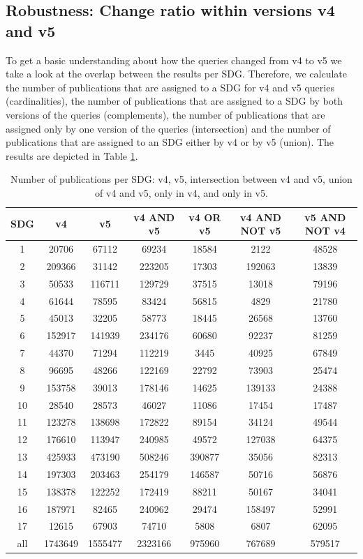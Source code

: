 \documentclass{article}
\begin{document}
\subsection{Robustness: Change ratio within versions v4 and v5}
\label{sec:robustness}
To get a basic understanding about how the queries changed from v4 to v5 we take a look at the overlap between the results per SDG. Therefore, we calculate the number of publications that are assigned to a SDG for v4 and v5 queries (cardinalities), the number of publications that are assigned to a SDG by both versions of the queries (complements), the number of publications that are assigned only by one version of the queries (intersection) and the number of publications that are assigned to an SDG either by v4 or by v5 (union). The results are depicted in Table \ref{venndataofpublications}.
\begin{table}[H]
\centering 
 \begin{tabular}{ccccccc}
 \toprule
  SDG & v4 & v5 & v4 AND v5 & v4 OR v5 & v4 AND NOT v5 & v5 AND NOT v4 \\
  \hline
 1 & 20706 & 67112 & 69234 & 18584 & 2122 & 48528 \\
 2 & 209366 & 31142 & 223205 & 17303 & 192063 & 13839 \\
 3 & 50533 & 116711 & 129729 & 37515 & 13018 & 79196 \\
 4 & 61644 & 78595 & 83424 & 56815 & 4829 & 21780 \\
 5 & 45013 & 32205 & 58773 & 18445 & 26568 & 13760 \\
 6 & 152917 & 141939 & 234176 & 60680 & 92237 & 81259 \\
 7 & 44370 & 71294 & 112219 & 3445 & 40925 & 67849 \\
 8 & 96695 & 48266 & 122169 & 22792 & 73903 & 25474 \\
 9 & 153758 & 39013 & 178146 & 14625 & 139133 & 24388 \\
 10 & 28540 & 28573 & 46027 & 11086 & 17454 & 17487 \\
 11 & 123278 & 138698 & 172822 & 89154 & 34124 & 49544 \\
 12 & 176610 & 113947 & 240985 & 49572 & 127038 & 64375 \\
 13 & 425933 & 473190 & 508246 & 390877 & 35056 & 82313 \\
 14 & 197303 & 203463 & 254179 & 146587 & 50716 & 56876 \\
 15 & 138378 & 122252 & 172419 & 88211 & 50167 & 34041 \\
 16 & 187971 & 82465 & 240962 & 29474 & 158497 & 52991 \\
 17 & 12615 & 67903 & 74710 & 5808 & 6807 & 62095 \\
 all & 1743649 & 1555477 & 2323166 & 975960 & 767689 & 579517 \\
 \bottomrule
\end{tabular}\caption{Number of publications per SDG: v4, v5, intersection between v4 and v5, union of v4 and v5, only in v4, and only in v5.}
\label{venndataofpublications}
\end{table}
\end{document}
